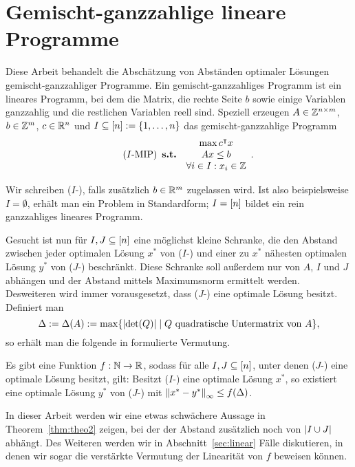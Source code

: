 \section{Gemischt-ganzzahlige lineare Programme}\label{introduction}

Diese Arbeit behandelt die Abschätzung von Abständen optimaler Lösungen
gemischt-ganzzahliger Programme.
Ein gemischt-ganzzahliges Programm ist ein lineares Programm, bei dem die
Matrix, die rechte Seite $b$ sowie einige Variablen ganzzahlig und die
restlichen Variablen reell sind.
Speziell erzeugen $A\in\mathbb{Z}^{n\times m}$, $b\in\mathbb{Z}^m$, $c\in\mathbb{R}^n$ und $I\subseteq[n]:=\{1,\dots,n\}$ das gemischt-ganzzahlige Programm
\begin{equation}\tag{$I$-\MIPI}
\begin{array}{lc}
	&\max c\transpose x \\
	\subjectTo &Ax\leq b\\
	&\forall i\in I: x_i\in\Z
\end{array}.
\end{equation}

Wir schreiben ($I$-\MIPR), falls zusätzlich $b\in\mathbb{R}^m$ zugelassen wird.
Ist also beispielsweise $I=\emptyset$, erhält man ein Problem in Standardform; $I=[n]$ bildet ein rein ganzzahliges lineares Programm.

Gesucht ist nun für $I,J\subseteq[n]$ eine möglichst kleine Schranke, die den Abstand zwischen jeder optimalen Lösung $x^*$ von ($I$-\MIPI) und einer zu $x^*$ nähesten optimalen Lösung $y^*$ von ($J$-\MIPI) beschränkt.
Diese Schranke soll außerdem nur von $A$, $I$ und $J$ abhängen und der Abstand mittels Maximumsnorm ermittelt werden.
Desweiteren wird immer vorausgesetzt, dass ($J$-\MIPI) eine optimale Lösung besitzt.
Definiert man
$$\Delta:=\Delta(A):=\max\{\lvert  \det(Q) \rvert \mid Q \text{ quadratische Untermatrix von } A \},$$
so erhält man die folgende in \cite{Paat2018} formulierte Vermutung.

\begin{conjecture}\label{con:delta}
	Es gibt eine Funktion $f: \mathbb{N}\rightarrow\mathbb{R}$, sodass für alle $I,J\subseteq[n]$, unter denen ($J$-\MIPI) eine optimale Lösung besitzt, gilt:
	Besitzt ($I$-\MIPI) eine optimale Lösung $x^*$, so existiert eine optimale 
	Lösung $y^*$ von ($J$-\MIPI) mit $\left\lVert x^* - y^*\right\rVert_\infty\leq f(\Delta)$.
\end{conjecture}

In dieser Arbeit werden wir eine etwas schwächere Aussage in Theorem~\ref{thm:theo2} zeigen, bei der der Abstand zusätzlich noch von $\lvert I\cup J \rvert$ abhängt.
Des Weiteren werden wir in Abschnitt~\ref{sec:linear} Fälle diskutieren, in denen wir sogar die verstärkte Vermutung der Linearität von $f$ beweisen können.
